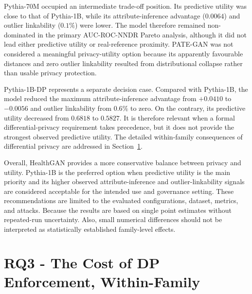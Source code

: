 Pythia-70M occupied an intermediate trade-off position. Its predictive
utility was close to that of Pythia-1B, while its attribute-inference
advantage ($0.0064$) and outlier linkability ($0.1\%$) were lower.
The model therefore remained non-dominated in the primary AUC-ROC-NNDR Pareto
analysis, although it did not lead either predictive utility or
real-reference proximity. PATE-GAN was not considered a meaningful
privacy-utility option because its apparently favourable distances and
zero outlier linkability resulted from distributional collapse rather
than usable privacy protection.

Pythia-1B-DP represents a separate decision case. Compared with Pythia-1B,
the model reduced the maximum attribute-inference advantage from $+0.0410$ to
$-0.0056$ and outlier linkability from $0.6\%$ to zero. On the contrary, its
predictive utility decreased from $0.6818$ to $0.5827$. It is therefore relevant
when a formal differential-privacy requirement takes precedence, but it
does not provide the strongest observed predictive utility. The detailed
within-family consequences of differential privacy are addressed in
Section~\ref{sec:results:rq3}.

Overall, HealthGAN provides a more conservative balance between privacy
and utility. Pythia-1B is the preferred
option when predictive utility is the main priority and its higher
observed attribute-inference and outlier-linkability signals are
considered acceptable for the intended use and governance setting.
These recommendations are limited to the evaluated configurations,
dataset, metrics, and attacks. Because the results are based on single
point estimates without repeated-run uncertainty. Also, small numerical
differences should not be interpreted as statistically established
family-level effects.


\section{RQ3 - The Cost of DP Enforcement, Within-Family}
\label{sec:results:rq3}

%

